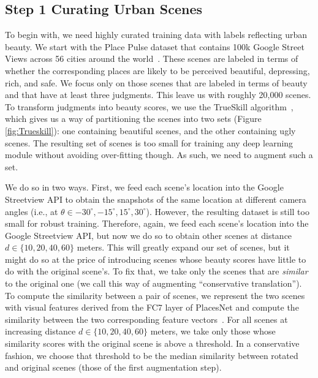 \subsection*{Step 1 Curating Urban Scenes}
\label{Sec:dataset}
To begin with, we need highly curated training data with labels reflecting urban beauty. We start with the  Place Pulse dataset that contains 100k Google Street Views across 56 cities around the world~\cite{dubey2016deep}. These scenes are labeled in terms of whether the corresponding places are likely to be perceived beautiful, depressing, rich, and safe. We focus only on those scenes that are labeled in terms of beauty and that have at least three judgments. This leave us with roughly  20,000 scenes. To transform judgments into beauty scores, we use the TrueSkill algorithm~\cite{herbrich2007trueskill}, which gives us a way of partitioning the scenes into two sets (Figure \ref{fig:Trueskill}): one containing beautiful scenes, and the other containing ugly scenes. The resulting set of scenes is too small for training any deep learning module without avoiding over-fitting though. As such, we need to augment such a set. 

We do so in two ways. First, we feed each scene's location into the Google Streetview API to obtain  the snapshots of the same location at different camera angles (i.e., at $\theta \in {-30^{\circ}, -15^{\circ} , 15^{\circ} , 30^{\circ} }$). However, the resulting dataset is still too small for robust training. Therefore, again, we feed each scene's location into the Google Streetview API, but now we do so to obtain other scenes at  distance $d \in \{10,20,40,60\}$ meters.  This will greatly expand our set of scenes, but it might do so at the price of introducing scenes whose beauty scores have little to do with the original scene's. To fix that, we take only the scenes that are \emph{similar} to the original one (we call this way of augmenting ``conservative translation''). To compute the similarity between a pair of scenes, we represent the two scenes with visual features derived from the FC7 layer of PlacesNet and compute the similarity between the two corresponding feature vectors~\cite{zhou2014learning}. For all scenes at increasing distance $d \in \{10,20,40,60\}$ meters,  we take only those whose similarity scores with the original scene is above a threshold. In a conservative fashion, we choose that threshold to be the median similarity between rotated and original scenes (those of the first augmentation step). 

